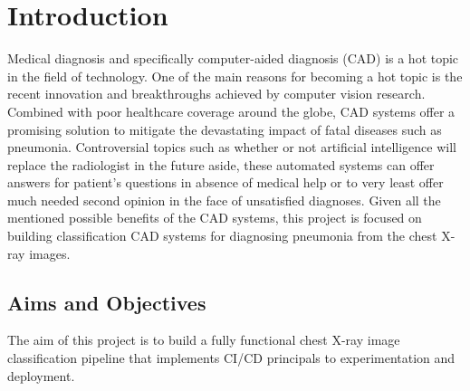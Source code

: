 \chapter{Introduction} \label{chap:introduction}

Medical diagnosis and specifically computer-aided diagnosis (CAD) is a hot topic in the field of technology. One of the main reasons for becoming a hot topic is the recent innovation and breakthroughs achieved by computer vision research. Combined with poor healthcare coverage around the globe, CAD systems offer a promising solution to mitigate the devastating impact of fatal diseases such as pneumonia. Controversial topics such as whether or not artificial intelligence will replace the radiologist in the future aside, these automated systems can offer answers for patient's questions in absence of medical help or to very least offer much needed second opinion in the face of unsatisfied diagnoses. Given all the mentioned possible benefits of the CAD systems, this project is focused on building classification CAD systems for diagnosing pneumonia from the chest X-ray images.

\section{Aims and Objectives} \label{sec:aimsandobj}
The aim of this project is to build a fully functional chest X-ray image classification pipeline that implements CI/CD principals to experimentation and deployment.

